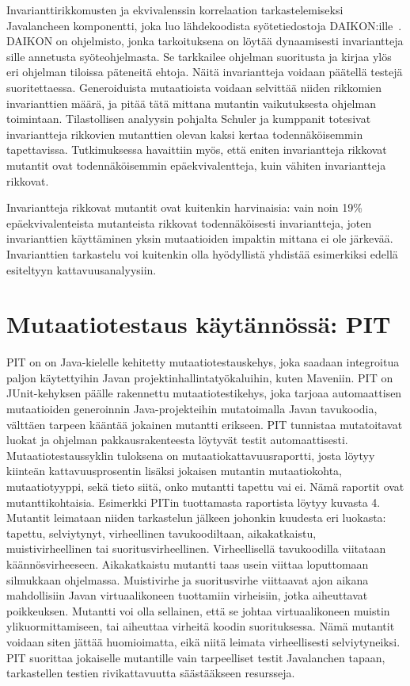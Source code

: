 \documentclass[finnish]{tktltiki2}
\begin{document}
Invarianttirikkomusten ja ekvivalenssin korrelaation tarkastelemiseksi Javalancheen komponentti, joka luo lähdekoodista syötetiedostoja DAIKON:ille~\cite{ErnstPGMPTX2007}. DAIKON on ohjelmisto, jonka tarkoituksena on löytää dynaamisesti invariantteja sille annetusta syöteohjelmasta. Se tarkkailee ohjelman suoritusta ja kirjaa ylös eri ohjelman tiloissa päteneitä ehtoja. Näitä invariantteja voidaan päätellä testejä suoritettaessa. Generoiduista mutaatioista voidaan selvittää niiden rikkomien invarianttien määrä, ja pitää tätä mittana mutantin vaikutuksesta ohjelman toimintaan. Tilastollisen analyysin pohjalta Schuler ja kumppanit totesivat invariantteja rikkovien mutanttien olevan kaksi kertaa todennäköisemmin tapettavissa. Tutkimuksessa havaittiin myös, että eniten invariantteja rikkovat mutantit ovat todennäköisemmin epäekvivalentteja, kuin vähiten invariantteja rikkovat. 

Invariantteja rikkovat mutantit ovat kuitenkin harvinaisia: vain noin 19\% epäekvivalenteista mutanteista rikkovat todennäköisesti invariantteja, joten invarianttien käyttäminen yksin mutaatioiden impaktin mittana ei ole järkevää. Invarianttien tarkastelu voi kuitenkin olla hyödyllistä yhdistää esimerkiksi edellä esiteltyyn kattavuusanalyysiin.

\section{Mutaatiotestaus käytännössä: PIT}
PIT on on Java-kielelle kehitetty mutaatiotestauskehys, joka saadaan integroitua paljon käytettyihin Javan projektinhallintatyökaluihin, kuten Maveniin. PIT on JUnit-kehyksen päälle rakennettu mutaatiotestikehys, joka tarjoaa automaattisen mutaatioiden generoinnin Java-projekteihin mutatoimalla Javan tavukoodia, välttäen tarpeen kääntää jokainen mutantti erikseen. PIT tunnistaa mutatoitavat luokat ja ohjelman pakkausrakenteesta löytyvät testit automaattisesti. Mutaatiotestaussyklin tuloksena on mutaatiokattavuusraportti, josta löytyy kiinteän kattavuusprosentin lisäksi jokaisen mutantin mutaatiokohta, mutaatiotyyppi, sekä tieto siitä, onko mutantti tapettu vai ei. Nämä raportit ovat mutanttikohtaisia. Esimerkki PITin tuottamasta raportista löytyy kuvasta 4. Mutantit leimataan niiden tarkastelun jälkeen johonkin kuudesta eri luokasta: tapettu, selviytynyt, virheellinen tavukoodiltaan, aikakatkaistu, muistivirheellinen tai suoritusvirheellinen. Virheellisellä tavukoodilla viitataan käännösvirheeseen. Aikakatkaistu mutantti taas usein viittaa loputtomaan silmukkaan ohjelmassa. Muistivirhe ja suoritusvirhe viittaavat ajon aikana mahdollisiin Javan virtuaalikoneen tuottamiin virheisiin, jotka aiheuttavat poikkeuksen. Mutantti voi olla sellainen, että se johtaa virtuaalikoneen muistin ylikuormittamiseen, tai aiheuttaa virheitä koodin suorituksessa. Nämä mutantit voidaan siten jättää huomioimatta, eikä niitä leimata virheellisesti selviytyneiksi. PIT suorittaa jokaiselle mutantille vain tarpeelliset testit Javalanchen tapaan, tarkastellen testien rivikattavuutta säästääkseen resursseja.
\end{document}
